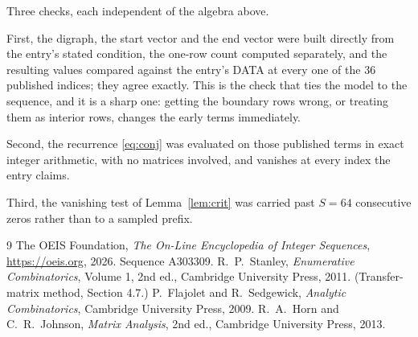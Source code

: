 \documentclass[11pt,a4paper]{article}
\theoremstyle{plain}
\theoremstyle{definition}
\begin{document}
Three checks, each independent of the algebra above.

First, the digraph, the start vector and the end vector were built directly from the
entry's stated condition, the one-row count computed separately, and the resulting values
compared against the entry's DATA at every one of the $36$ published indices; they
agree exactly. This is the check that ties the model to the sequence, and it is a sharp one:
getting the boundary rows wrong, or treating them as interior rows, changes the early terms
immediately.

Second, the recurrence \eqref{eq:conj} was evaluated on those published terms in exact
integer arithmetic, with no matrices involved, and vanishes at every index the entry claims.

Third, the vanishing test of Lemma~\ref{lem:crit} was carried past $S=64$ consecutive
zeros rather than to a sampled prefix.

\begin{thebibliography}{9}
 The OEIS Foundation, \emph{The On-Line Encyclopedia of Integer
Sequences}, \url{https://oeis.org}, 2026. Sequence A303309.
 R.~P.~Stanley, \emph{Enumerative Combinatorics}, Volume 1, 2nd ed.,
Cambridge University Press, 2011. (Transfer-matrix method, Section 4.7.)
 P.~Flajolet and R.~Sedgewick, \emph{Analytic Combinatorics}, Cambridge
University Press, 2009.
 R.~A.~Horn and C.~R.~Johnson, \emph{Matrix Analysis}, 2nd ed., Cambridge
University Press, 2013.
\end{thebibliography}
\end{document}

